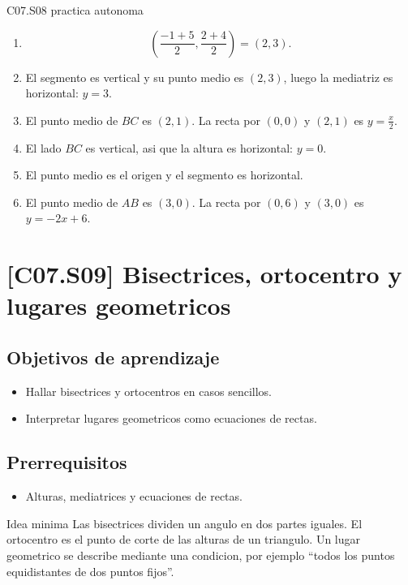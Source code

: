 \begin{fullsolution}{C07.S08 practica autonoma}
\begin{enumerate}[label=\textbf{PX-C07.S08-\arabic*:}, leftmargin=*]
  \item
  \[
  \left(\frac{-1+5}{2},\frac{2+4}{2}\right)=(2,3).
  \]
  \item El segmento es vertical y su punto medio es \((2,3)\), luego la mediatriz es
  horizontal: \(y=3\).
  \item El punto medio de \(BC\) es \((2,1)\). La recta por \((0,0)\) y \((2,1)\) es
  \(y=\frac{x}{2}\).
  \item El lado \(BC\) es vertical, asi que la altura es horizontal: \(y=0\).
  \item El punto medio es el origen y el segmento es horizontal.
  \item El punto medio de \(AB\) es \((3,0)\). La recta por \((0,6)\) y \((3,0)\) es
  \(y=-2x+6\).
\end{enumerate}
\end{fullsolution}

\section{[C07.S09] Bisectrices, ortocentro y lugares geometricos}

\subsection*{Objetivos de aprendizaje}
\begin{itemize}
  \item Hallar bisectrices y ortocentros en casos sencillos.
  \item Interpretar lugares geometricos como ecuaciones de rectas.
\end{itemize}

\subsection*{Prerrequisitos}
\begin{itemize}
  \item Alturas, mediatrices y ecuaciones de rectas.
\end{itemize}

\begin{theorybox}{Idea minima}
Las bisectrices dividen un angulo en dos partes iguales. El ortocentro es el punto de corte de
las alturas de un triangulo. Un lugar geometrico se describe mediante una condicion, por
ejemplo ``todos los puntos equidistantes de dos puntos fijos''.
\end{theorybox}

